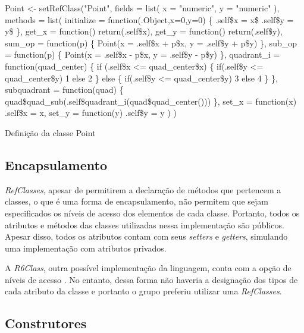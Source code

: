 \documentclass[rel_mlp]{iiufrgs}
\makeatletter
\newcommand{\nosemic}{\renewcommand{\@endalgocfline}{\relax}}%
\makeatother
\begin{document}
\begin{algorithm}
  \label{point_class}
\nosemic Point <- setRefClass("Point",\;
\nosemic  fields = list(\;
\nosemic    x = "numeric",\;
\nosemic    y = "numeric"\;
\nosemic  ),\;
\nosemic  methods = list(\;
\nosemic    initialize = function(.Object,x=0,y=0) {\{} \;
\nosemic      .self{\$}x = x{\$}\;
\nosemic      .self{\$}y = y{\$}\;
\nosemic    {\}}, \;
\nosemic    get{\_}x = function() return(.self{\$}x),\;
\nosemic    get{\_}y = function() return(.self{\$}y),\;
\nosemic    sum{\_}op = function(p) {\{}\;
\nosemic      Point(x = .self{\$}x + p{\$}x, y = .self{\$}y + p{\$}y)\;
\nosemic    {\}},\;
\nosemic    sub{\_}op = function(p) {\{}\;
\nosemic      Point(x = .self{\$}x - p{\$}x, y = .self{\$}y - p{\$}y)\;
\nosemic    {\}},\;
\nosemic    quadrant{\_}i = function(quad{\_}center) {\{}\;
\nosemic      if (.self{\$}x <= quad{\_}center{\$}x) {\{}\;
\nosemic        if(.self{\$}y <= quad{\_}center{\$}y) 1 else 2\;
\nosemic      {\}} else {\{}\;
\nosemic        if(.self{\$}y <= quad{\_}center{\$}y) 3 else 4\;
\nosemic      {\}}\;
\nosemic    {\}},\;
\nosemic    subquadrant = function(quad) {\{}\;
\nosemic      quad{\$}quad{\_}sub(.self{\$}quadrant{\_}i(quad{\$}quad{\_}center()))\;
\nosemic    {\}},\;
\nosemic    set{\_}x = function(x) .self{\$}x = x,\;
\nosemic    set{\_}y = function(y) .self{\$}y = y\;
\nosemic  )\;
\nosemic )\;

\caption{Definição da classe Point}
\end{algorithm}


\subsection{Encapsulamento}

 \textit{RefClasses}, apesar de permitirem a declaração de métodos que pertencem a classes, o que é uma
 forma de encapsulamento, não permitem que sejam especificados os níveis de acesso dos elementos de cada
 classe. Portanto, todos os atributos e métodos das classes utilizadas nessa implementação são públicos.
 Apesar disso, todos os atributos contam com seus \textit{setters} e \textit{getters}, simulando uma
 implementação com atributos privados.

 A \textit{R6Class}, outra possível implementação da linguagem, conta com a opção de níveis de acesso \cite{R6}.
 No entanto, dessa forma não haveria a designação dos tipos de cada atributo da classe e portanto o grupo
 preferiu utilizar uma \textit{RefClasses}.

\subsection{Construtores}
\end{document}
